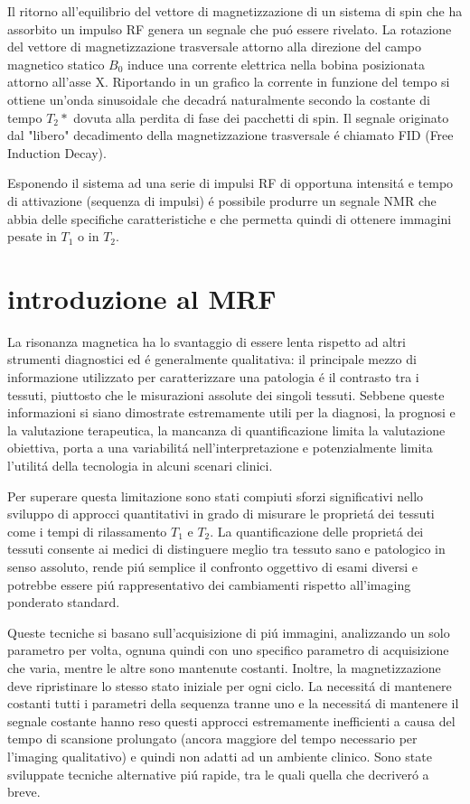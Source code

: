 \documentclass[a4paper,12pt]{report}
\begin{document}
 Il ritorno all'equilibrio del vettore di magnetizzazione di un sistema di spin che ha assorbito un impulso RF genera un segnale che pu\'o essere rivelato.
 La rotazione del vettore di magnetizzazione trasversale attorno alla direzione del campo magnetico statico $B_0$ induce una corrente elettrica nella bobina posizionata attorno all'asse X. 
 Riportando in un grafico la corrente in funzione del tempo si ottiene un'onda sinusoidale che decadr\'a naturalmente secondo la costante di tempo $T_2*$ dovuta alla perdita di fase dei pacchetti di spin. 
 Il segnale originato dal "libero" decadimento della magnetizzazione trasversale \'e chiamato FID (Free Induction Decay).

 Esponendo il sistema ad una serie di impulsi RF di opportuna intensit\'a e tempo di attivazione (sequenza di impulsi) \'e possibile produrre un segnale NMR che abbia delle specifiche caratteristiche e che permetta quindi di ottenere immagini pesate in $T_1$ o in $T_2$.
 
 \section{introduzione al MRF}
 
 La risonanza magnetica ha lo svantaggio di essere lenta rispetto ad altri strumenti diagnostici ed \'e generalmente qualitativa: il principale mezzo di informazione utilizzato per caratterizzare una patologia \'e il contrasto tra i tessuti, piuttosto che le misurazioni assolute dei singoli tessuti. 
 Sebbene queste informazioni si siano dimostrate estremamente utili per la diagnosi, la prognosi e la valutazione terapeutica, la mancanza di quantificazione limita la valutazione obiettiva, porta a una variabilit\'a nell'interpretazione e potenzialmente limita l'utilit\'a della tecnologia in alcuni scenari clinici. 
 
 Per superare questa limitazione sono stati compiuti sforzi significativi nello sviluppo di approcci quantitativi in grado di misurare le propriet\'a dei tessuti come i tempi di rilassamento $T_1$ e $T_2$. 
 La quantificazione delle propriet\'a dei tessuti consente ai medici di distinguere meglio tra tessuto sano e patologico in senso assoluto, rende pi\'u semplice il confronto oggettivo di esami diversi e potrebbe essere pi\'u rappresentativo dei cambiamenti rispetto all'imaging ponderato standard.  
 
 Queste tecniche si basano sull'acquisizione di pi\'u immagini, analizzando un solo parametro per volta, ognuna quindi con uno specifico parametro di acquisizione che varia, mentre le altre sono mantenute costanti. 
 Inoltre, la magnetizzazione deve ripristinare lo stesso stato iniziale per ogni ciclo. 
 La necessit\'a di mantenere costanti tutti i parametri della sequenza tranne uno e la necessit\'a di mantenere il segnale costante hanno reso questi approcci estremamente inefficienti a causa del tempo di scansione prolungato (ancora maggiore del tempo necessario per l'imaging qualitativo) e quindi non adatti ad un ambiente clinico. 
 Sono state sviluppate tecniche alternative pi\'u rapide, tra le quali quella che decriver\'o a breve. 
 
\end{document}
